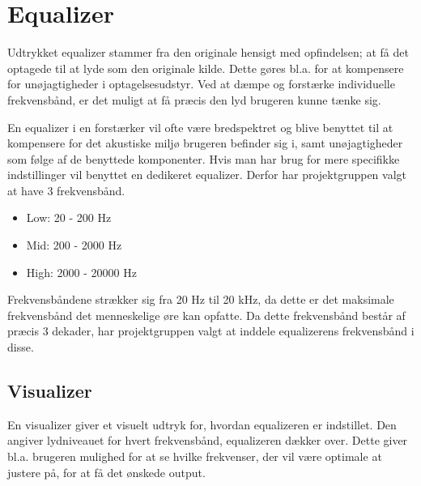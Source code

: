 \section{Equalizer}
\label{equalizer}
Udtrykket equalizer stammer fra den originale hensigt med opfindelsen; at få det optagede til at lyde som den originale kilde. Dette gøres bl.a. for at kompensere for unøjagtigheder i optagelsesudstyr. Ved at dæmpe og forstærke individuelle frekvensbånd, er det muligt at få præcis den lyd brugeren kunne tænke sig. 

En equalizer i en forstærker vil ofte være bredspektret og blive benyttet til at kompensere for det akustiske miljø brugeren befinder sig i, samt unøjagtigheder som følge af de benyttede komponenter. Hvis man har brug for mere specifikke indstillinger vil benyttet en dedikeret equalizer. Derfor har projektgruppen valgt at have 3 frekvensbånd.

\begin{itemize}
\item Low: 20 - 200 Hz
\item Mid: 200 - 2000 Hz
\item High: 2000 - 20000 Hz
\end{itemize}

Frekvensbåndene strækker sig fra 20 Hz til 20 kHz, da dette er det maksimale frekvensbånd det menneskelige øre kan opfatte. Da dette frekvensbånd består af præcis 3 dekader, har projektgruppen valgt at inddele equalizerens frekvensbånd i disse.

\subsection{Visualizer}
\label{visualizer}
En visualizer giver et visuelt udtryk for, hvordan equalizeren er indstillet. Den angiver lydniveauet for hvert frekvensbånd, equalizeren dækker over. Dette giver bl.a. brugeren mulighed for at se hvilke frekvenser, der vil være optimale at justere på, for at få det ønskede output.